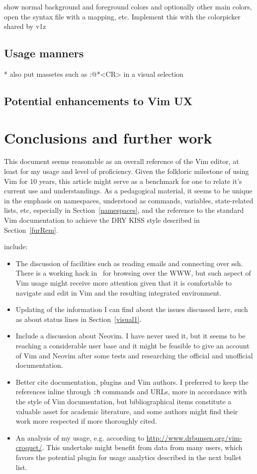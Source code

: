\documentclass{article}
\newcommand{\tttt}[1]{\texttt{#1}}
\begin{document}
show normal background and foreground colors and optionally other main
colors, open the syntax file with a mapping, etc.
Implement this with the colorpicker shared by v1z


\subsection{Usage manners}
  * also put massetes such as :@*<CR> in a visual selection

\subsection{Potential enhancements to Vim UX}

\section{Conclusions and further work}\label{conc}
This document seems reasonable as an overall reference of the Vim editor,
at least for my usage and level of proficiency.
Given the folkloric milestone of using Vim for 10 years,
this article might serve as a benchmark for one to relate
it's current use and understandings.
As a pedagogical material, it seems to be unique in the emphasis
on namespaces, understood as commands, variables, state-related lists, etc,
especially in Section~\ref{namespaces},
and the reference to the standard Vim documentation
to achieve the DRY KISS style described in Section~\ref{furRem}.

 include:
\begin{itemize}
  \item The discussion of facilities such as reading emails and connecting over ssh.
    There is a working hack in~\cite{vimrc} for browsing over the WWW,
    but such aspect of Vim usage might receive more attention
    given that it is comfortable to navigate and edit in Vim
    and the resulting integrated environment.
  \item Updating of the information I can find about the issues discussed here,
    such as about status lines in Section~\ref{visual1}.
  \item Include a discussion about Neovim.
    I have never used it, but it seems to be reaching a considerable user base
    and it might be feasible to give an account of Vim and Neovim
    after some tests and researching the official and unofficial documentation.
  \item Better cite documentation, plugins and Vim authors.
    I preferred to keep the references inline through \tttt{:h} commands
    and URLs, more in accordance with the style of Vim documentation,
    but bibliographical items constitute a valuable asset for academic literature,
    and some authors might find their work more respected if more
    thoroughly cited.
  \item An analysis of my usage, e.g. according to \url{http://www.drbunsen.org/vim-croquet/}.
    This undertake might benefit from data from many users,
    which favors the potential plugin for usage analytics described in the next bullet list.
\end{itemize}
\end{document}
